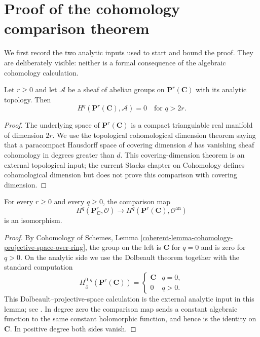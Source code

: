 \section{Proof of the cohomology comparison theorem}
\label{section-proof-gaga-cohomology}

We first record the two analytic inputs used to start and bound the proof.
They are deliberately visible: neither is a formal consequence of the
algebraic cohomology calculation.

\begin{lemma}
\label{lemma-projective-analytic-cohomological-dimension}
Let $r \geq 0$ and let $\mathcal A$ be a sheaf of abelian groups on
$\mathbf P^r(\mathbf C)$ with its analytic topology. Then
$$
H^q(\mathbf P^r(\mathbf C),\mathcal A)=0
\quad\text{for }q>2r.
$$
\end{lemma}

\begin{proof}
The underlying space of $\mathbf P^r(\mathbf C)$ is a compact triangulable
real manifold of dimension $2r$. We use the topological cohomological
dimension theorem saying that a paracompact Hausdorff space of covering
dimension $d$ has vanishing sheaf cohomology in degrees greater than $d$.
This covering-dimension theorem is an external topological input; the
current Stacks chapter on Cohomology defines cohomological dimension but
does not prove this comparison with covering dimension.
\end{proof}

\begin{lemma}
\label{lemma-projective-structure-sheaf-comparison}
For every $r \geq 0$ and every $q \geq 0$, the comparison map
$$
H^q(\mathbf P^r_{\mathbf C},\mathcal O)
\longrightarrow
H^q(\mathbf P^r(\mathbf C),\mathcal O^{\mathrm{an}})
$$
is an isomorphism.
\end{lemma}

\begin{proof}
By Cohomology of Schemes, Lemma
\ref{coherent-lemma-cohomology-projective-space-over-ring}, the group on the
left is $\mathbf C$ for $q=0$ and is zero for $q>0$. On the analytic side we
use the Dolbeault theorem together with the standard computation
$$
H^{0,q}_{\overline\partial}(\mathbf P^r(\mathbf C))=
\begin{cases}
\mathbf C & q=0,\\
0 & q>0.
\end{cases}
$$
This Dolbeault--projective-space calculation is the external analytic input
in this lemma; see \cite[\S 2, no. 13]{GAGA}. In degree zero the comparison
map sends a constant algebraic function to the same constant holomorphic
function, and hence is the identity on $\mathbf C$. In positive degree both
sides vanish.
\end{proof}

